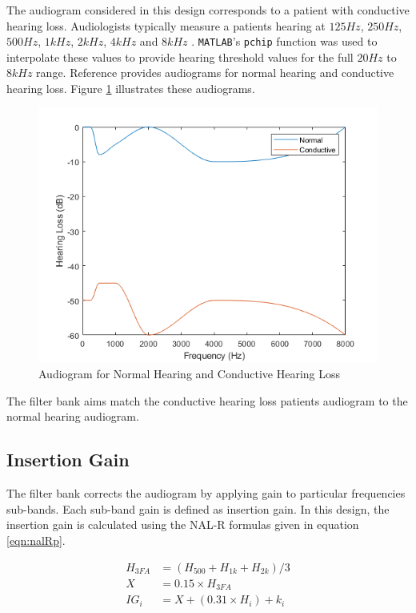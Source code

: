 \documentclass[11pt,onecolumn]{witseiepaper}
\begin{document}
\noindent The audiogram considered in this design corresponds to a patient with conductive hearing loss. Audiologists typically measure a patients hearing at $125Hz$, $250Hz$, $500Hz$, $1kHz$, $2kHz$, $4kHz$ and $8kHz$ \cite{mahmoud}. \texttt{MATLAB}'s \texttt{pchip} function was used to interpolate these values to provide hearing threshold values for the full $20Hz$ to $8kHz$ range. Reference \cite{mahmoud} provides audiograms for normal hearing and conductive hearing loss. Figure \ref{fig:normCondAudio} illustrates these audiograms.

\begin{figure}[h]
\centering
\includegraphics[width=0.6\linewidth]{normCondAudiogram.PNG}
\caption{Audiogram for Normal Hearing and Conductive Hearing Loss}
\label{fig:normCondAudio}
\end{figure}  

\noindent The filter bank aims match the conductive hearing loss patients audiogram to the normal hearing audiogram.

\subsection{Insertion Gain}
\label{sec:insertGain}

\noindent The filter bank corrects the audiogram by applying gain to particular frequencies sub-bands. Each sub-band gain is defined as insertion gain. In this design, the insertion gain is calculated using the NAL-R formulas given in equation \ref{eqn:nalRp}.

\begin{equation}
\label{eqn:nalRp}
\begin{aligned}
H_{3FA} &= (H_{500} + H_{1k} + H_{2k})/3 \\
X &= 0.15 \times H_{3FA} \\ 
IG_i &= X + (0.31\times H_i) + k_i
\end{aligned}
\end{equation}
\end{document}
